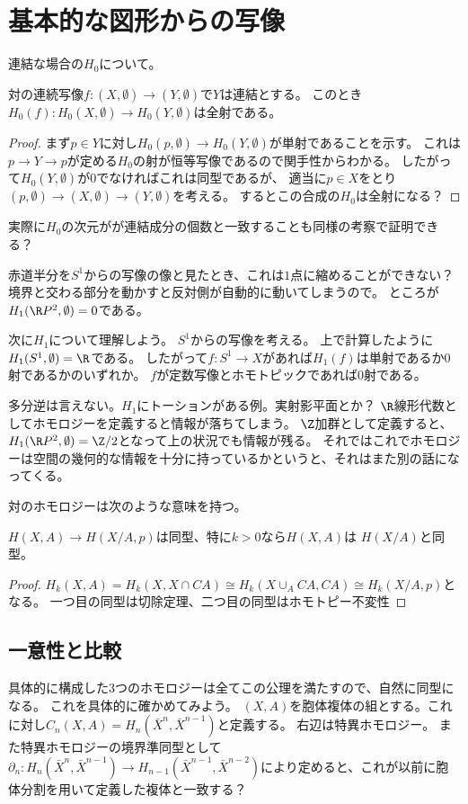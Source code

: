 \documentclass{jsarticle}
\begin{document}
\section{基本的な図形からの写像}

連結な場合の$H_0$について。
\begin{prop}
対の連続写像$f\colon(X,\emptyset)\to (Y,\emptyset)$で$Y$は連結とする。
このとき$H_0(f)\colon H_0(X,\emptyset)\to H_0(Y,\emptyset)$は全射である。
\end{prop}
\begin{proof}
まず$p\in Y$に対し$H_0(p,\emptyset)\to H_0(Y,\emptyset)$が単射であることを示す。
これは$p\to Y \to p$が定める$H_0$の射が恒等写像であるので関手性からわかる。
したがって$H_0(Y,\emptyset)$が$0$でなければこれは同型であるが、
適当に$p\in X$をとり$(p,\emptyset)\to (X,\emptyset)\to (Y,\emptyset)$を考える。
するとこの合成の$H_0$は全射になる？
\end{proof}

実際に$H_0$の次元がが連結成分の個数と一致することも同様の考察で証明できる？


赤道半分を$S^1$からの写像の像と見たとき、これは$1$点に縮めることができない？
境界と交わる部分を動かすと反対側が自動的に動いてしまうので。
ところが$H_1(\R P^2,\emptyset)=0$である。

\begin{prop}
次に$H_1$について理解しよう。
$S^1$からの写像を考える。
上で計算したように$H_1(S^1,\emptyset)=\R$である。
したがって$f\colon S^1\to X$があれば$H_1(f)$は単射であるか$0$射であるかのいずれか。
$f$が定数写像とホモトピックであれば$0$射である。
\end{prop}
多分逆は言えない。$H_1$にトーションがある例。実射影平面とか？
$\R$線形代数としてホモロジーを定義すると情報が落ちてしまう。
$\Z$加群として定義すると、$H_1(\R P^2,\emptyset)=\Z/2$となって上の状況でも情報が残る。
それではこれでホモロジーは空間の幾何的な情報を十分に持っているかというと、それはまた別の話になってくる。

対のホモロジーは次のような意味を持つ。
\begin{prop}
$H(X,A)\to H(X/A,p)$は同型、特に$k>0$なら$H(X,A)$は $H(X/A)$と同型。
\end{prop}

\begin{proof}
$H_k(X,A)=H_k(X,X\cap CA)\cong H_k(X\cup_ACA,CA)\cong H_k(X/A,p)$となる。
一つ目の同型は切除定理、二つ目の同型はホモトピー不変性
\end{proof}

\subsection{一意性と比較}
具体的に構成した3つのホモロジーは全てこの公理を満たすので、自然に同型になる。
これを具体的に確かめてみよう。
$(X,A)$を胞体複体の組とする。これに対し$C_n(X,A)=H_n(\bar{X}^n,\bar{X}^{n-1})$と定義する。
右辺は特異ホモロジー。
また特異ホモロジーの境界準同型として$\partial_n\colon H_n(\bar{X}^n,\bar{X}^{n-1})\to H_{n-1}(\bar{X}^{n-1},\bar{X}^{n-2})$により定めると、これが以前に胞体分割を用いて定義した複体と一致する？
\end{document}

